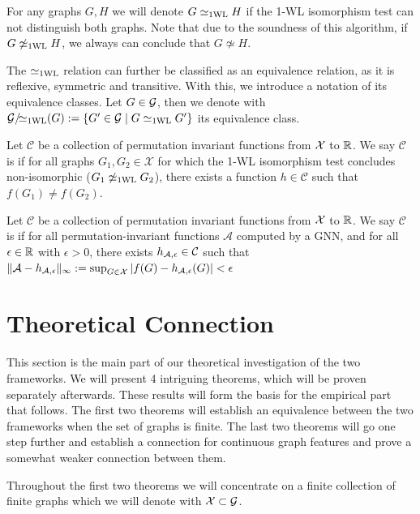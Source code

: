 \begin{definition}[1-WL Relation]
    For any graphs $G,H$ we will denote $G \simeq_{\text{1WL}} H$ if the 1-WL isomorphism test can not distinguish both graphs. Note that due to the soundness of this algorithm, if $G \not\simeq_{\text{1WL}} H$, we always can conclude that $G \not\simeq H$.
\end{definition}

The $\simeq_{\text{1WL}}$ relation can further be classified as an equivalence relation, as it is reflexive, symmetric and transitive. With this, we introduce a notation of its equivalence classes. Let $G \in \mathcal{G}$, then we denote with $\mathcal{G}/\!{\simeq_{\text{1WL}}}(G): = \{ G' \in \mathcal{G} \mid G \simeq_{\text{1WL}} G' \}$ its equivalence class.

\begin{definition}[$\wldisc$]
    Let $\mathcal{C}$ be a collection of permutation invariant functions from $\mathcal{X}$ to $\mathbb{R}$. We say $\mathcal{C}$ is \textbf{\wldisc} if for all graphs $G_1, G_2 \in \mathcal{X}$ for which the 1-WL isomorphism test concludes non-isomorphic ($G_1 \not\simeq_{\text{1WL}} G_2$), there exists a function $h \in \mathcal{C}$ such that $f(G_1) \neq f(G_2)$.
\end{definition}

\begin{definition}[$\gapp$]
    Let $\mathcal{C}$ be a collection of permutation invariant functions from $\mathcal{X}$ to $\mathbb{R}$. We say $\mathcal{C}$ is \textbf{\gapp} if for all permutation-invariant functions $\mathcal{A}$ computed by a GNN, and for all $\epsilon \in \mathbb{R}$ with $\epsilon > 0$, there exists $h_{\mathcal{A},\epsilon} \in \mathcal{C}$ such that $\| \mathcal{A} - h_{\mathcal{A},\epsilon} \|_\infty := \sup_{G \in \mathcal{X}} |f(G) - h_{\mathcal{A},\epsilon}(G)| < \epsilon$
\end{definition}

\section{Theoretical Connection}
This section is the main part of our theoretical investigation of the two frameworks. We will present 4 intriguing theorems, which will be proven separately afterwards. These results will form the basis for the empirical part that follows. The first two theorems will establish an equivalence between the two frameworks when the set of graphs is finite. The last two theorems will go one step further and establish a connection for continuous graph features and prove a somewhat weaker connection between them.

Throughout the first two theorems we will concentrate on a finite collection of finite graphs which we will denote with $\mathcal{X} \subset \mathcal{G}$.

